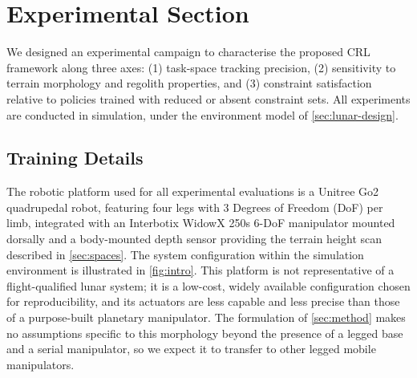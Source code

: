 \section{Experimental Section} \label{sec:results}

We designed an experimental campaign to characterise the proposed CRL framework along three axes: (1) task-space tracking precision, (2) sensitivity to terrain morphology and regolith properties, and (3) constraint satisfaction relative to policies trained with reduced or absent constraint sets. All experiments are conducted in simulation, under the environment model of \cref{sec:lunar-design}.

\subsection{Training Details} \label{sec:implementation}


The robotic platform used for all experimental evaluations is a Unitree Go2 quadrupedal robot, featuring four legs with 3 Degrees of Freedom (DoF) per limb, integrated with an Interbotix WidowX 250s 6-DoF manipulator mounted dorsally and a body-mounted depth sensor providing the terrain height scan described in \cref{sec:spaces}. The system configuration within the simulation environment is illustrated in \cref{fig:intro}. This platform is not representative of a flight-qualified lunar system; it is a low-cost, widely available configuration chosen for reproducibility, and its actuators are less capable and less precise than those of a purpose-built planetary manipulator. The formulation of \cref{sec:method} makes no assumptions specific to this morphology beyond the presence of a legged base and a serial manipulator, so we expect it to transfer to other legged mobile manipulators.

